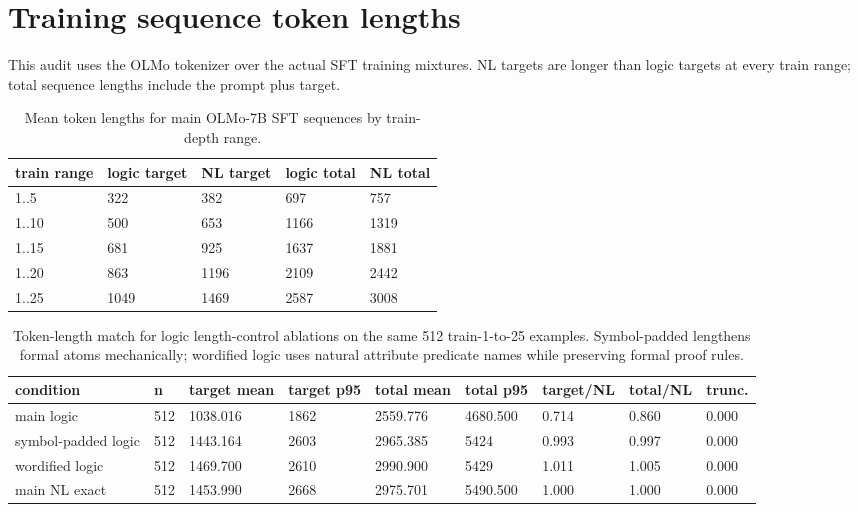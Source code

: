 \documentclass[10pt]{article}
\begin{document}
\section{Training sequence token lengths}
This audit uses the OLMo tokenizer over the actual SFT training mixtures. NL targets are longer than logic targets at every train range; total sequence lengths include the prompt plus target.

\begin{table}[H]
\centering
\small
\begin{tabular}{lllll}
\toprule
train range & logic target & NL target & logic total & NL total \\
\midrule
1..5 & 322 & 382 & 697 & 757 \\
1..10 & 500 & 653 & 1166 & 1319 \\
1..15 & 681 & 925 & 1637 & 1881 \\
1..20 & 863 & 1196 & 2109 & 2442 \\
1..25 & 1049 & 1469 & 2587 & 3008 \\
\bottomrule
\end{tabular}
\caption{Mean token lengths for main OLMo-7B SFT sequences by train-depth range.}
\end{table}

\begin{table}[H]
\centering
\small
\begin{tabular}{lllllllll}
\toprule
condition & n & target mean & target p95 & total mean & total p95 & target/NL & total/NL & trunc. \\
\midrule
main logic & 512 & 1038.016 & 1862 & 2559.776 & 4680.500 & 0.714 & 0.860 & 0.000 \\
symbol-padded logic & 512 & 1443.164 & 2603 & 2965.385 & 5424 & 0.993 & 0.997 & 0.000 \\
wordified logic & 512 & 1469.700 & 2610 & 2990.900 & 5429 & 1.011 & 1.005 & 0.000 \\
main NL exact & 512 & 1453.990 & 2668 & 2975.701 & 5490.500 & 1.000 & 1.000 & 0.000 \\
\bottomrule
\end{tabular}
\caption{Token-length match for logic length-control ablations on the same 512 train-1-to-25 examples. Symbol-padded lengthens formal atoms mechanically; wordified logic uses natural attribute predicate names while preserving formal proof rules.}
\end{table}
\end{document}
